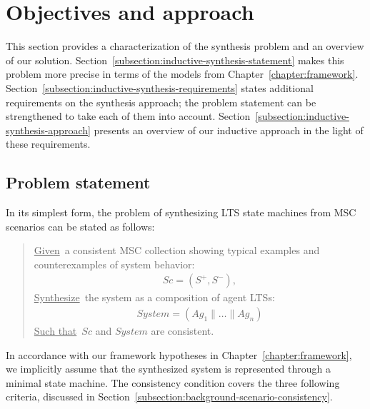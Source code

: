 \section{Objectives and approach\label{section:inductive-objectives-and-approach}}

This section provides a characterization of the synthesis problem and an overview of our solution. Section~\ref{subsection:inductive-synthesis-statement} makes this problem more precise in terms of the models from Chapter~\ref{chapter:framework}. Section~\ref{subsection:inductive-synthesis-requirements} states additional requirements on the synthesis approach; the problem statement can be strengthened to take each of them into account. Section~\ref{subsection:inductive-synthesis-approach} presents an overview of our inductive approach in the light of these requirements.


\subsection{Problem statement\label{subsection:inductive-synthesis-statement}}

In its simplest form, the problem of synthesizing LTS state machines from MSC scenarios can be stated as follows:

\begin{quote}
\underline{Given}~a consistent MSC collection showing typical examples and counterexamples of system behavior:
\begin{align*}
Sc = (S^+,S^-),
\end{align*}
\underline{Synthesize}~the system as a composition of agent LTSs:
\begin{align*}
System = (Ag_1 \parallel \ldots \parallel Ag_n)
\end{align*}
\underline{Such that}~$Sc$ and $System$ are consistent.
\end{quote}

In accordance with our framework hypotheses in Chapter~\ref{chapter:framework}, we implicitly assume that the synthesized system is represented through a minimal state machine. The consistency condition covers the three following criteria, discussed in Section~\ref{subsection:background-scenario-consistency}.

